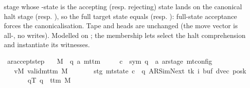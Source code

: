 \begin{isabellebody}
\begin{isamarkuptext}
   stage whose -state  is the
  accepting (resp. rejecting) state lands on the canonical halt stage
   (resp. ),
  so the full target state equals 
  (resp. ): full-state
  acceptance forces the canonicalisation.  Tape and heads are
  unchanged (the move vector is all-, no writes).  Modelled on
  ; the membership lets  select the halt
  comprehension and instantiate its witnesses.%
\end{isamarkuptext}\isamarkuptrue%
\isamarkupfalse%
\ ar{\isacharunderscore}{\kern0pt}accept{\isacharunderscore}{\kern0pt}step{\isacharcolon}{\kern0pt}\isanewline
\ \ \ M\ {\isacharcolon}{\kern0pt}{\isacharcolon}{\kern0pt}\ {\isachardoublequoteopen}{\isacharparenleft}{\kern0pt}{\isacharprime}{\kern0pt}q{\isacharcomma}{\kern0pt}\ {\isacharprime}{\kern0pt}a{\isacharparenright}{\kern0pt}\ mttm{\isachardoublequoteclose}\isanewline
\ \ \ \ \ c{\isacharprime}{\kern0pt}\ {\isacharcolon}{\kern0pt}{\isacharcolon}{\kern0pt}\ {\isachardoublequoteopen}{\isacharparenleft}{\kern0pt}sym{}{\isacharcomma}{\kern0pt}\ {\isacharprime}{\kern0pt}q\ {\isasymtimes}\ {\isacharprime}{\kern0pt}a\ ar{\isacharunderscore}{\kern0pt}stage{\isacharparenright}{\kern0pt}\ mt{\isacharunderscore}{\kern0pt}config{\isachardoublequoteclose}\isanewline
\ \ \ vM{\isacharcolon}{\kern0pt}\ {\isachardoublequoteopen}valid{\isacharunderscore}{\kern0pt}mttm\ M{\isachardoublequoteclose}\isanewline
\ \ \ \ \ \ \ stg{\isacharcolon}{\kern0pt}\ {\isachardoublequoteopen}mt{\isacharunderscore}{\kern0pt}state\ c{\isacharprime}{\kern0pt}\ {\isacharequal}{\kern0pt}\ {\isacharparenleft}{\kern0pt}q{\isacharcomma}{\kern0pt}\ AR{\isacharunderscore}{\kern0pt}SimNext{\isacharcomma}{\kern0pt}\ tk{\isacharcomma}{\kern0pt}\ i{\isacharcomma}{\kern0pt}\ buf{\isacharcomma}{\kern0pt}\ dvec{\isacharcomma}{\kern0pt}\ posk{\isacharparenright}{\kern0pt}{\isachardoublequoteclose}\isanewline
\ \ \ \ \ \ \ qT{\isacharcolon}{\kern0pt}\ {\isachardoublequoteopen}q\ {\isacharequal}{\kern0pt}\ t{\isacharunderscore}{\kern0pt}tm\ M{\isachardoublequoteclose}\isanewline

\end{isabellebody}
